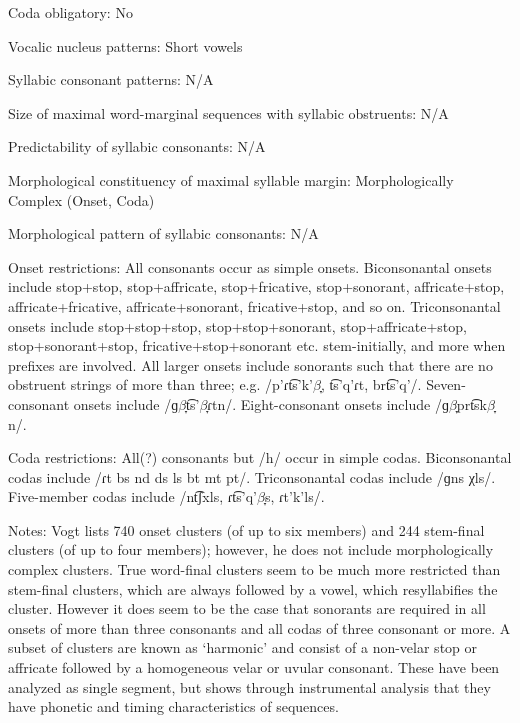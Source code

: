 {\begin{appendixdesc}
\item[Coda obligatory:] No

\item[Vocalic nucleus patterns:] Short vowels

\item[Syllabic consonant patterns:] N/A

\item[Size of maximal word-marginal sequences with syllabic obstruents:] N/A

\item[Predictability of syllabic consonants:] N/A

\item[Morphological constituency of maximal syllable margin:] Morphologically Complex (Onset, Coda)

\item[Morphological pattern of syllabic consonants:] N/A

\item[Onset restrictions:] All consonants occur as simple onsets. Biconsonantal onsets include stop+stop, stop+affricate, stop+fricative, stop+sonorant, affricate+stop, affricate+fricative, affricate+sonorant, fricative+stop, and so on. Triconsonantal onsets include stop+stop+stop, stop+stop+sonorant, stop+affricate+stop, stop+sonorant+stop, fricative+stop+sonorant etc. stem-initially, and more when prefixes are involved. All larger onsets include sonorants such that there are no obstruent strings of more than three; e.g. /p’ɾt͡s’k'$\beta ̞$, t͡s’q’ɾt, brt͡s'q{}'/. Seven-consonant onsets include /ɡ$\beta ̞$t͡s’$\beta ̞ɾ$tn/. Eight-consonant onsets include /ɡ$\beta ̞$prt͡sk$\beta ̞$n/.

\item[Coda restrictions:] All(?) consonants but /h/ occur in simple codas. Biconsonantal codas include /ɾt bs nd ds ls bt mt pt/. Triconsonantal codas include /ɡns χls/. Five-member codas include /nt͡ʃxls, ɾt͡s’q’$\beta ̞$s, ɾt'k'ls/.

\item[Notes:] Vogt lists 740 onset clusters (of up to six members) and 244 stem-final clusters (of up to four members); however, he does not include morphologically complex clusters. True word-final clusters seem to be much more restricted than stem-final clusters, which are always followed by a vowel, which resyllabifies the cluster. However it does seem to be the case that sonorants are required in all onsets of more than three consonants and all codas of three consonant or more. A subset of clusters are known as ‘harmonic’ and consist of a non-velar stop or affricate followed by a homogeneous velar or uvular consonant. These have been analyzed as single segment, but \citet{Chitoran1998} shows through instrumental analysis that they have phonetic and timing characteristics of sequences.
\end{appendixdesc}
}
